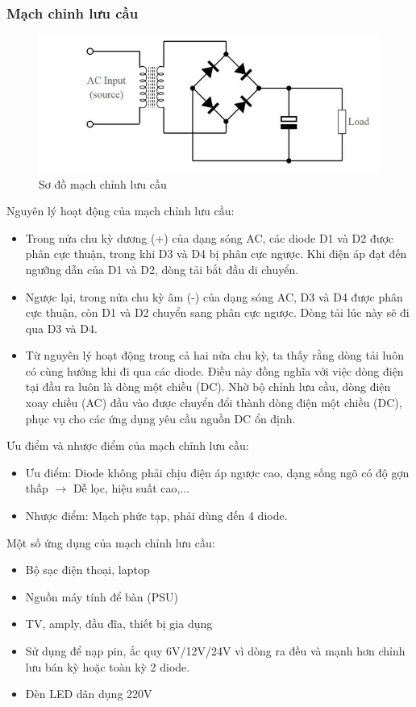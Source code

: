 \documentclass[a4paper,15pt]{article}
\begin{document}
\subsubsection{Mạch chỉnh lưu cầu}
\begin{figure}[H]
    \centering
    \includegraphics[scale=0.7]{img/sodomachcau.PNG}
    \caption{Sơ đồ mạch chỉnh lưu cầu}
    \label{fig:enter-label}
\end{figure}
Nguyên lý hoạt động của mạch chỉnh lưu cầu:
\begin{itemize}
    \item Trong nửa chu kỳ dương (+) của dạng sóng AC, các diode D1 và D2 được phân cực thuận, trong khi D3 và D4 bị phân cực ngược. Khi điện áp đạt đến ngưỡng dẫn của D1 và D2, dòng tải bắt đầu di chuyển.
    \item Ngược lại, trong nửa chu kỳ âm (-) của dạng sóng AC, D3 và D4 được phân cực thuận, còn D1 và D2 chuyển sang phân cực ngược. Dòng tải lúc này sẽ đi qua D3 và D4.
    \item Từ nguyên lý hoạt động trong cả hai nửa chu kỳ, ta thấy rằng dòng tải luôn có cùng hướng khi đi qua các diode. Điều này đồng nghĩa với việc dòng điện tại đầu ra luôn là dòng một chiều (DC). Nhờ bộ chỉnh lưu cầu, dòng điện xoay chiều (AC) đầu vào được chuyển đổi thành dòng điện một chiều (DC), phục vụ cho các ứng dụng yêu cầu nguồn DC ổn định.
\end{itemize}
Ưu điểm và nhược điểm của mạch chỉnh lưu cầu:
\begin{itemize}
    \item Ưu điểm: Diode không phải chịu điện áp ngược cao, dạng sống ngõ có độ gợn thấp $\rightarrow$ Dễ lọc, hiệu suất cao,...
    \item Nhược điểm: Mạch phức tạp, phải dùng đến 4 diode.
\end{itemize}
Một số ứng dụng của mạch chỉnh lưu cầu:
\begin{itemize}
    \item Bộ sạc điện thoại, laptop
    \item Nguồn máy tính để bàn (PSU)
    \item TV, amply, đầu đĩa, thiết bị gia dụng
    \item Sử dụng để nạp pin, ắc quy 6V/12V/24V vì dòng ra đều và mạnh hơn chỉnh lưu bán kỳ hoặc toàn kỳ 2 diode.
    \item Đèn LED dân dụng 220V
\end{itemize}
\newpage
\end{document}
